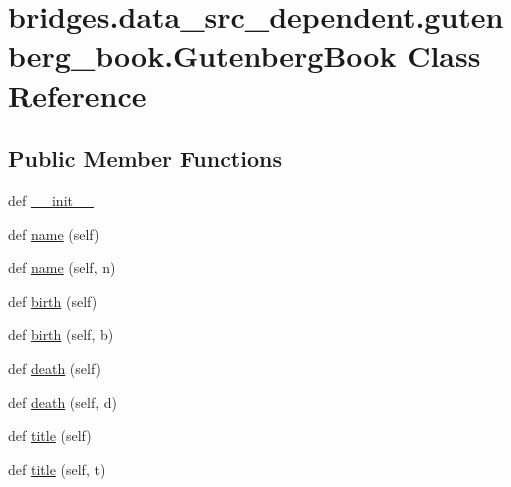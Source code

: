 \hypertarget{classbridges_1_1data__src__dependent_1_1gutenberg__book_1_1_gutenberg_book}{}\section{bridges.\+data\+\_\+src\+\_\+dependent.\+gutenberg\+\_\+book.\+Gutenberg\+Book Class Reference}
\label{classbridges_1_1data__src__dependent_1_1gutenberg__book_1_1_gutenberg_book}
\subsection*{Public Member Functions}
\begin{DoxyCompactItemize}
\item 
def \mbox{\hyperlink{classbridges_1_1data__src__dependent_1_1gutenberg__book_1_1_gutenberg_book_ac44f922d6f63fc6ab3c0788ea9b9c4b5}{\+\_\+\+\_\+init\+\_\+\+\_\+}}
\item 
def \mbox{\hyperlink{classbridges_1_1data__src__dependent_1_1gutenberg__book_1_1_gutenberg_book_a8b7e11a07b7227b7798e6c461f0e3e88}{name}} (self)
\item 
def \mbox{\hyperlink{classbridges_1_1data__src__dependent_1_1gutenberg__book_1_1_gutenberg_book_aa3aefe0ebdc4d09c1011399b52808e62}{name}} (self, n)
\item 
def \mbox{\hyperlink{classbridges_1_1data__src__dependent_1_1gutenberg__book_1_1_gutenberg_book_a4f3d3453a3cd9702174d74c916018fbd}{birth}} (self)
\item 
def \mbox{\hyperlink{classbridges_1_1data__src__dependent_1_1gutenberg__book_1_1_gutenberg_book_a228d27a028d1abff133807d372da5b82}{birth}} (self, b)
\item 
def \mbox{\hyperlink{classbridges_1_1data__src__dependent_1_1gutenberg__book_1_1_gutenberg_book_a2ad2399a95ded7f560fcb3a5293faf5d}{death}} (self)
\item 
def \mbox{\hyperlink{classbridges_1_1data__src__dependent_1_1gutenberg__book_1_1_gutenberg_book_aaa05c897d2d38783236362e76dfbcb41}{death}} (self, d)
\item 
def \mbox{\hyperlink{classbridges_1_1data__src__dependent_1_1gutenberg__book_1_1_gutenberg_book_aa26adb962fe01a2661f350fab167a144}{title}} (self)
\item 
def \mbox{\hyperlink{classbridges_1_1data__src__dependent_1_1gutenberg__book_1_1_gutenberg_book_abc4d2b106849f50e0132a604c8874f0d}{title}} (self, t)

\end{DoxyCompactItemize}
